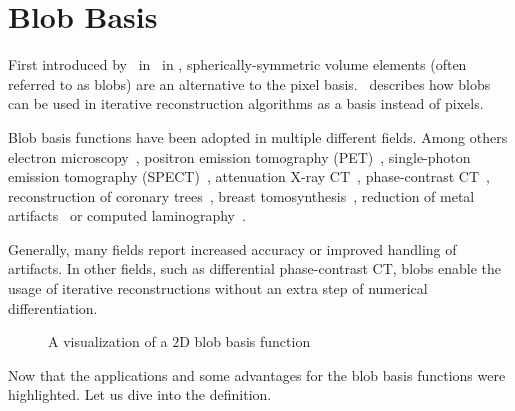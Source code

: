 \section{Blob Basis}\label{sec:blob_basis}

First introduced by~\citeauthor*{lewitt_multidimensional_1990}
in~\cite{lewitt_multidimensional_1990} in \citeyear{lewitt_multidimensional_1990},
spherically-symmetric volume elements (often referred to as blobs) are an alternative to the pixel
basis.~\cite{lewitt_alternatives_1992} describes how blobs can be used in iterative reconstruction
algorithms as a basis instead of pixels.

Blob basis functions have been adopted in multiple different fields. Among others electron
microscopy~\cite{marabini_3d_1998, garduno_optimization_2001}, positron emission tomography
(PET)~\cite{jacobs_comparative_1999, chlewicki_noise_2004}, single-photon emission tomography
(SPECT)~\cite{wang_3d_2004, yendiki_comparison_2004}, attenuation X-ray
CT~\cite{jacobs_iterative_1999, carvalho_helical_2003, isola_motion-compensated_2008},
phase-contrast CT~\cite{kohler_iterative_2011, xu_investigation_2012}, reconstruction of coronary
trees~\cite{zhou_blob-based_2008}, breast tomosynthesis~\cite{wu_breast_2010}, reduction of metal
artifacts~\cite{levakhina_two-step_2010} or computed laminography~\cite{trampert_spherically_2017}.

Generally, many fields report increased accuracy or improved handling of artifacts. In other fields,
such as differential phase-contrast CT, blobs enable the usage of iterative reconstructions without
an extra step of numerical differentiation.

\begin{figure}
	\caption{A visualization of a \(2\)D blob basis function}\label{fig:blob_basis}
\end{figure}

Now that the applications and some advantages for the blob basis functions were highlighted. Let us
dive into the definition.

